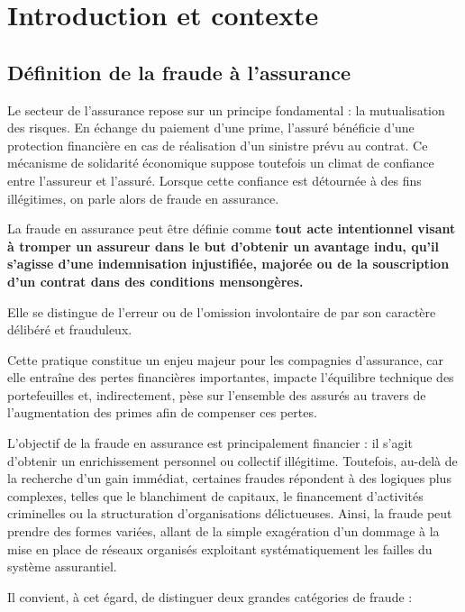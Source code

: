 \chapter{Introduction et contexte}
\label{chap:contexte}

\section{Définition de la fraude à l'assurance}

Le secteur de l'assurance repose sur un principe fondamental : la mutualisation des risques. En échange du paiement d'une prime, l'assuré bénéficie d'une protection financière en cas de réalisation d'un sinistre prévu au contrat. Ce mécanisme de solidarité économique suppose toutefois un climat de confiance entre l'assureur et l'assuré. Lorsque cette confiance est détournée à des fins illégitimes, on parle alors de fraude en assurance.

La fraude en assurance peut être définie comme \textbf{tout acte intentionnel visant à tromper un assureur dans le but d'obtenir un avantage indu, qu'il s'agisse d'une indemnisation injustifiée, majorée ou de la souscription d'un contrat dans des conditions mensongères.}

Elle se distingue de l'erreur ou de l'omission involontaire de par son caractère délibéré et frauduleux.

Cette pratique constitue un enjeu majeur pour les compagnies d'assurance, car elle entraîne des pertes financières importantes, impacte l'équilibre technique des portefeuilles et, indirectement, pèse sur l'ensemble des assurés au travers de l'augmentation des primes afin de compenser ces pertes.

L'objectif de la fraude en assurance est principalement financier : il s'agit d'obtenir un enrichissement personnel ou collectif illégitime. Toutefois, au-delà de la recherche d'un gain immédiat, certaines fraudes répondent à des logiques plus complexes, telles que le blanchiment de capitaux, le financement d'activités criminelles ou la structuration d'organisations délictueuses. Ainsi, la fraude peut prendre des formes variées, allant de la simple exagération d'un dommage à la mise en place de réseaux organisés exploitant systématiquement les failles du système assurantiel.

Il convient, à cet égard, de distinguer deux grandes catégories de fraude :

